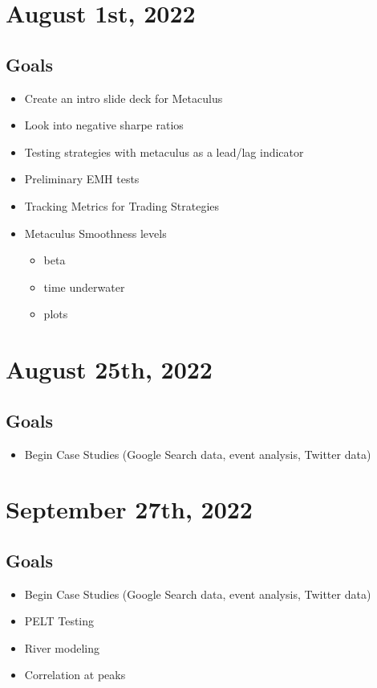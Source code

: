 \documentclass{article}
\begin{document}
\section{August 1st, 2022}
\subsection*{Goals}
\begin{itemize}
    \item Create an intro slide deck for Metaculus
    \item Look into negative sharpe ratios
    \item Testing strategies with metaculus as a lead/lag indicator
    \item Preliminary EMH tests
    \item Tracking Metrics for Trading Strategies
    \item Metaculus Smoothness levels
    \begin{itemize}
        \item beta
        \item time underwater
        \item plots
    \end{itemize}

\end{itemize}

\section{August 25th, 2022}
\subsection*{Goals}
\begin{itemize}
    \item Begin Case Studies (Google Search data, event analysis, Twitter data)
\end{itemize}

\section{September 27th, 2022}
\subsection*{Goals}
\begin{itemize}
    \item Begin Case Studies (Google Search data, event analysis, Twitter data)
    \item PELT Testing
    \item River modeling
    \item Correlation at peaks
\end{itemize}
\end{document}
